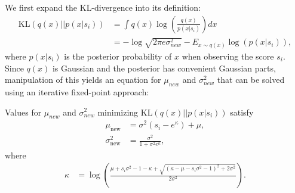 \documentclass[runningheads,a4paper]{llncs}
\newcommand{\unindentmore}{\hspace{-1.5mm}}
\begin{document}
We first expand the KL-divergence into its definition:
{\small
\begin{align}\label{eq:KL}
    \text{KL}\left(q(x)|| p(x|s_i)\right) &= \int q(x) \log \left( \frac{q(x)}{p(x|s_i)} \right) dx \nonumber \\
     \qquad &= -\log\sqrt{2\pi e \sigma_{new}^2} - E_{x\sim q(x)} \log \left( p(x|s_i) \right),
\end{align}}
\unindentmore where $p(x|s_i)$ is the posterior probability of $x$ when
observing the score $s_i$. Since $q(x)$ is Gaussian
and the posterior has convenient Gaussian parts, manipulation of this
yields an equation for $\mu_{new}$ and $\sigma_{new}^2$ that can be
solved using an iterative fixed-point approach:
\begin{lemma}
Values for $\mu_{new}$ and $\sigma_{new}^2$
minimizing $\text{KL}\left(q(x)|| p(x|s_i)\right)$
satisfy
{\small
\begin{align}\label{eq:ExactMuSigmaNew}
    \mu_{\text{new}} & = \sigma^{2}\left(s_i - e^\kappa\right) + \mu, \nonumber \\
   \sigma_{\text{new}}^2 & = \frac{\sigma^2}{1+\sigma^2 e^\kappa },
\end{align}}
where
{\small
\begin{align}\label{eq:approximationZQuad5}
     \kappa  &= \log\left(\frac{\mu + s_i\sigma^2-1-\kappa+\sqrt{(\kappa - \mu - s_i\sigma^2 -1)^2+2\sigma^2}}{2\sigma^2}\right).
\end{align}}
\end{lemma}
\end{document}
